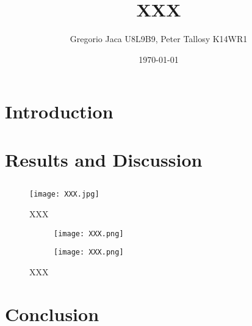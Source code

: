 \documentclass[12pt,a4paper]{article}
\title{XXX}
\author{Gregorio Jaca U8L9B9, Peter Tallosy K14WR1 }
\date{\today}
\begin{document}
\maketitle

\begin{abstract}

\end{abstract}

\section{Introduction}

\section{Results and Discussion}

\subsection{}

\begin{figure} [H]
    \centering
    \texttt{[image: XXX.jpg]}
    \caption{XXX}
    \label{fig:XXX}
\end{figure}

\begin{figure}[H]
    \centering
    \begin{subfigure}{\linewidth}
        \centering
        \texttt{[image: XXX.png]}
    \end{subfigure}
    
    \vspace{1em} %

    \begin{subfigure}{\linewidth}
        \centering
        \texttt{[image: XXX.png]}
    \end{subfigure}
    
    \caption{XXX}
    \label{fig:XXX}
\end{figure}

\section{Conclusion}
\end{document}

